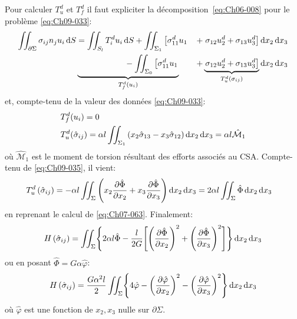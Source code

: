 Pour calculer $T_u^d$ et $T_f^d$ il faut expliciter la décomposition~\eqref{eq:Ch06-008} pour le problème \eqref{eq:Ch09-033}: 
\begin{equation*}
    \begin{aligned}
        \iint_{\partial \Sigma} \sigma_{ij} n_j u_i \ud S &= \iint_{S_l} T_i^d u_i \ud S + \iint_{\Sigma_1} \left[ \sigma_{11}^d u_1 \right. &+ \left. \sigma_{12} u_2^d + \sigma_{13} u_3^d \right] \ud x_2 \ud x_3 \\
        & \underbrace{\phantom{\iint_{S_l} T_i^d u_i \ud S} -\iint_{\Sigma_0} \left[ \sigma_{11}^d u_1 \right.}_{T_f^d (u_i)} &+\underbrace{\left. \sigma_{12} u_2^d + \sigma_{13} u_3^d \right]}_{T_u^d (\sigma_{ij})} \ud x_2 \ud x_3
    \end{aligned}
\end{equation*}
et, compte-tenu de la valeur des données \eqref{eq:Ch09-033}: 
\begin{align}
  &  T_f^d (u_i) = 0\label{eq:Ch09-038}\\
  &  T_u^d (\hat{\sigma}_{ij}) = \alpha l  \iint_{\Sigma_1} \left( x_2 \hat{\sigma}_{13} - x_3 \hat{\sigma}_{12} \right) \mathop{\mathrm{{}d}}\mathopen{} x_2 \mathop{\mathrm{{}d}}\mathopen{} x_3 = \alpha l \hat{\mathcal{M}}_1
    \label{eq:Ch09-039}
\end{align}
où $\hat{\mathcal{M}}_1$ est le moment de torsion résultant des efforts associés au CSA.
Compte-tenu de \eqref{eq:Ch09-035}, il vient: 
\begin{align*}
    T_u^d \left( \hat{\sigma}_{ij} \right) &= - \alpha l \iint_{\Sigma} \left( x_2 \frac{\partial \hat{\Phi}}{\partial x_2} + x_3 \frac{\partial \hat{\Phi}}{\partial x_3} \right) \mathop{\mathrm{{}d}}\mathopen{} x_2 \mathop{\mathrm{{}d}}\mathopen{} x_3 = 2 \alpha l \iint_{\Sigma} \hat{\Phi} \mathop{\mathrm{{}d}}\mathopen{} x_2 \mathop{\mathrm{{}d}}\mathopen{} x_3
\end{align*}
en reprenant le calcul de \eqref{eq:Ch07-063}.
Finalement: 
\begin{equation}
    H \left( \hat{\sigma}_{ij} \right) = \iint_{\Sigma} \Biggl\{ 2 \alpha l \hat{\Phi} - \frac{l}{2G} \Biggl[ \left( \frac{\partial \hat{\Phi}}{\partial x_2} \right)^2 + \left( \frac{\partial \hat{\Phi}}{\partial x_3} \right)^2 \Biggr] \Biggr\} \mathop{\mathrm{{}d}}\mathopen{} x_2 \mathop{\mathrm{{}d}}\mathopen{} x_3
    \label{eq:Ch09-040}
\end{equation}
ou en posant $\hat{\Phi} = G \alpha \hat{\varphi}$:
\begin{equation}
    H \left( \hat{\sigma}_{ij} \right) = \frac{G\alpha^2 l}{2} \iint_{\Sigma} \Biggl\{ 4 \hat{\varphi} - \left( \frac{\partial \hat{\varphi}}{\partial x_2} \right)^2 - \left( \frac{\partial \hat{\varphi}}{\partial x_3} \right)^2\Biggr\} \mathop{\mathrm{{}d}}\mathopen{} x_2 \mathop{\mathrm{{}d}}\mathopen{} x_3
    \label{eq:Ch09-041}
\end{equation}
où $\hat{\varphi}$ est une fonction de $x_2,x_3$ nulle sur $\partial \Sigma$.

